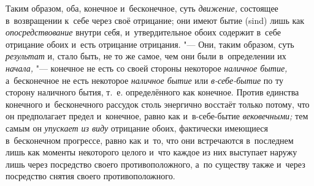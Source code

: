 Таким образом, оба, конечное и~бесконечное, суть
{\em движение,} состоящее в~возвращении к~себе через
своё отрицание; они имеют бытие (sind) лишь как
{\em опосредствование} внутри себя, и~утвердительное
обоих содержит в~себе отрицание обоих и~есть отрицание отрицания. "--- Они,
таким образом, суть {\em результат} и, стало быть, не
то же самое, чем они были в~определении их
{\em начала,} "--- конечное не есть со своей стороны
некоторое {\em наличное бытие,} а~бесконечное не есть
некоторое {\em наличное бытие} или
{\em в-себе-бытие} по ту сторону наличного бытия, т.~е.
определённого как конечное. Против единства конечного и~бесконечного
рассудок столь энергично восстаёт только потому, что он предполагает предел
и~конечное, равно как и~в-себе-бытие {\em вековечными;}
тем самым он {\em упускает из виду} отрицание обоих,
фактически имеющиеся в~бесконечном прогрессе, равно как и~то, что они
встречаются в~последнем лишь как моменты некоторого целого и~что каждое из
них выступает наружу лишь через посредство своего противоположного, а~по
существу также и~через посредство снятия своего противоположного.

